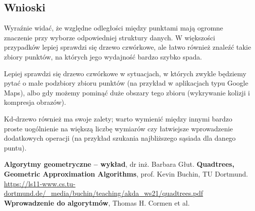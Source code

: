 \documentclass[12pt]{scrartcl}
\begin{document}
\subsection{Wnioski}
Wyraźnie widać, że względne odległości między punktami mają ogromne znaczenie przy wyborze odpowiedniej struktury danych. W większości przypadków lepiej sprawdzi się drzewo czwórkowe, ale łatwo również znaleźć takie zbiory punktów, na których jego wydajność bardzo szybko spada.

Lepiej sprawdzi się drzewo czwórkowe w sytuacjach, w których zwykle będziemy pytać o małe podzbiory zbioru punktów (na przykład w aplikacjach typu Google Maps), albo gdy możemy pominąć duże obszary tego zbioru (wykrywanie kolizji i kompresja obrazów).

Kd-drzewo również ma swoje zalety; warto wymienić między innymi bardzo proste uogólnienie na większą liczbę wymiarów czy łatwiejsze wprowadzenie dodatkowych operacji (na przykład szukania najbliższego sąsiada dla danego puntu).



\begin{thebibliography}{9}
     \textbf{Algorytmy geometryczne -- wykład}, dr inż. Barbara Głut.
     \textbf{Quadtrees, Geometric Approximation Algorithms}, prof. Kevin Buchin, TU Dortmund.
        \url{https://ls11-www.cs.tu-dortmund.de/_media/buchin/teaching/akda_ws21/quadtrees.pdf}
         \textbf{Wprowadzenie do algorytmów}, Thomas H. Cormen et al.
\end{thebibliography}
\end{document}
